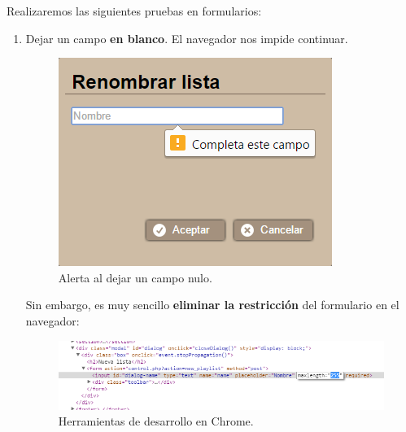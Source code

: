 Realizaremos las siguientes pruebas en formularios:

\begin{enumerate}
	\item Dejar un campo \textbf{en blanco}. El navegador nos impide continuar.
	
	\smallskip
	
	\begin{figure}[H]
		\noindent \begin{centering}
			\includegraphics[width=\linewidth/3]{capitulo6/cap_camponulo}
			\par\end{centering}
		\smallskip
		\caption{\label{fig:cap_camponulo} Alerta al dejar un campo nulo.}
	\end{figure}
	
	\smallskip
	
	Sin embargo, es muy sencillo \textbf{eliminar la restricción} del formulario en el navegador:
	
	\smallskip
	
	\begin{figure}[H]
		\noindent \begin{centering}
			\includegraphics[width=\linewidth*3/4]{capitulo6/cap_hackform}
			\par\end{centering}
		\smallskip
		\caption{\label{fig:cap_hackform} Herramientas de desarrollo en Chrome.}
	\end{figure}
	

\end{enumerate}

